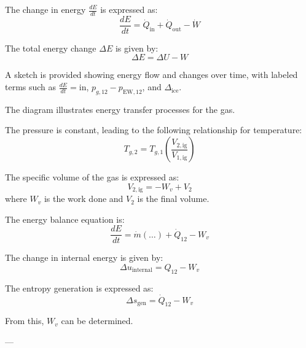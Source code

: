 The change in energy \( \frac{dE}{dt} \) is expressed as:  
\[
\frac{dE}{dt} = \dot{Q}_{\text{in}} + \dot{Q}_{\text{out}} - \dot{W}
\]  

The total energy change \( \Delta E \) is given by:  
\[
\Delta E = \Delta U - W
\]  

A sketch is provided showing energy flow and changes over time, with labeled terms such as \( \frac{dE}{dt} = \text{in} \), \( p_{g,12} - p_{\text{EW},12} \), and \( \Delta_{\text{ice}} \).  

The diagram illustrates energy transfer processes for the gas.

The pressure is constant, leading to the following relationship for temperature:  
\[
T_{g,2} = T_{g,1} \left( \frac{V_{2,\text{ig}}}{V_{1,\text{ig}}} \right)
\]  

The specific volume of the gas is expressed as:  
\[
V_{2,\text{ig}} = -W_v + V_2
\]  
where \( W_v \) is the work done and \( V_2 \) is the final volume.  

The energy balance equation is:  
\[
\frac{dE}{dt} = \dot{m} (\ldots) + \dot{Q}_{12} - W_v
\]  

The change in internal energy is given by:  
\[
\Delta u_{\text{internal}} = Q_{12} - W_v
\]  

The entropy generation is expressed as:  
\[
\Delta s_{\text{gen}} = \dot{Q}_{12} - W_v
\]  

From this, \( W_v \) can be determined.  

---